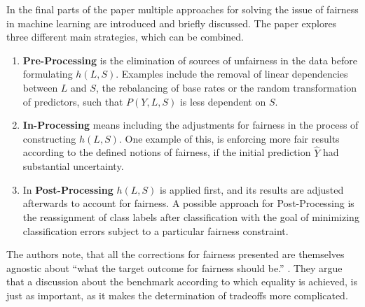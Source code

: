 In the final parts of the paper multiple approaches for solving the issue of fairness in 
machine learning are introduced and briefly discussed. The paper explores three different
main strategies, which can be combined.
\begin{enumerate}
    \item \textbf{Pre-Processing} is the elimination of sources of unfairness in the data before 
    formulating $h(L,S)$. Examples include the removal of linear dependencies between $L$ and
    $S$, the rebalancing of base rates or the random transformation of predictors, such that
    $P(Y,L,S)$ is less dependent on $S$.
    \item \textbf{In-Processing} means including the adjustments for fairness in the process 
    of constructing $h(L,S)$. One example of this, is enforcing more fair results according 
    to the defined notions of fairness, if the initial prediction $\hat{Y}$ had substantial 
    uncertainty.
    \item In \textbf{Post-Processing} $h(L,S)$ is applied first, and its results are adjusted
    afterwards to account for fairness. A possible approach for Post-Processing is the 
    reassignment of class labels after classification with the goal of minimizing 
    classification errors subject to a particular fairness constraint.
\end{enumerate}

The authors note, that all the corrections for fairness presented are themselves agnostic 
about \enquote{what the target outcome for fairness should be.} \cite{Berk.2018}. They 
argue that a discussion about the benchmark according to which equality is achieved, is just as
important, as it makes the determination of tradeoffs more complicated.